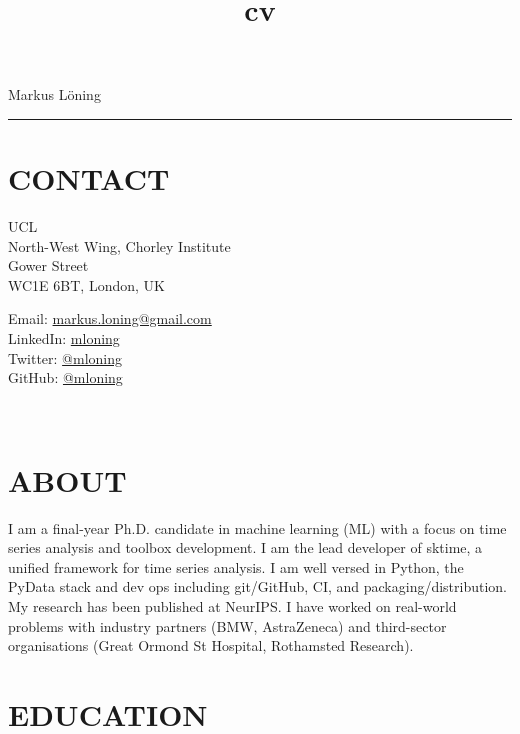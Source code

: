 \documentclass{cv}
\title{cv}
\begin{document}
{\LARGE Markus Löning}
\vspace{12pt}
\hrule

\section{CONTACT}

\begin{minipage}{.44\textwidth}
\vspace{3pt}
{\raggedright{} UCL \\
North-West Wing, Chorley Institute \\
Gower Street \\
WC1E 6BT, London, UK}
\end{minipage}
\hspace{1.25cm}
\begin{minipage}{.44\textwidth}
\vspace{3pt}
Email: \href{mailto:markus.loning@gmail.com}{markus.loning@gmail.com} \\
LinkedIn: \href{https://linkedin.com/in/mloning}{mloning} \\
Twitter: \href{https://twitter.com/mloning_}{@mloning\textunderscore} \\
GitHub: \href{https://github.com/mloning}{@mloning}
\end{minipage}
\\

\section{ABOUT}

I am a final-year Ph.D. candidate in machine learning (ML) with a focus on time series analysis and toolbox development. I am the lead developer of sktime, a unified framework for time series analysis. I am well versed in Python, the PyData stack and dev ops including git/GitHub, CI, and packaging/distribution. My research has been published at NeurIPS. I have worked on real-world problems with industry partners (BMW, AstraZeneca) and third-sector organisations (Great Ormond St Hospital, Rothamsted Research).

\section{EDUCATION}
\end{document}
